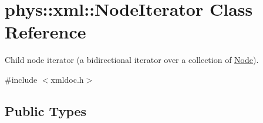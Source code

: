 \hypertarget{classphys_1_1xml_1_1NodeIterator}{
\section{phys::xml::NodeIterator Class Reference}
\label{da/d4f/classphys_1_1xml_1_1NodeIterator}
}


Child node iterator (a bidirectional iterator over a collection of \hyperlink{classphys_1_1xml_1_1Node}{Node}).  




{\ttfamily \#include $<$xmldoc.h$>$}

\subsection*{Public Types}
